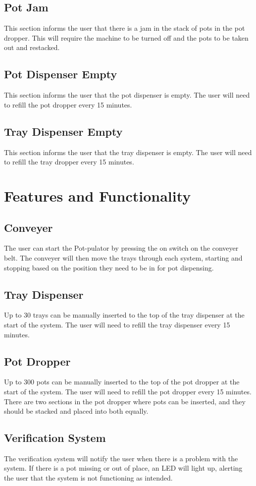 \documentclass{article}
\begin{document}
\subsection{Pot Jam}
This section informs the user that there is a jam in the stack of pots in the pot dropper. This will require the machine to be turned off and the pots to be taken out and restacked. 
\subsection{Pot Dispenser Empty}
This section informs the user that the pot dispenser is empty. The user will need to refill the pot dropper every 15 minutes.
\subsection{Tray Dispenser Empty}
This section informs the user that the tray dispenser is empty. The user will need to refill the tray dropper every 15 minutes.
\section{Features and Functionality}
\subsection{Conveyer}
The user can start the Pot-pulator by pressing the on switch on the conveyer belt. The conveyer will then move the trays through each system, starting and stopping based on the position they need to be in for pot dispensing. 
\subsection{Tray Dispenser}
Up to 30 trays can be manually inserted to the top of the tray dispenser at the start of the system. The user will need to refill the tray dispenser every 15 minutes.
\subsection{Pot Dropper}
Up to 300 pots can be manually inserted to the top of the pot dropper at the start of the system. The user will need to refill the pot dropper every 15 minutes. There are two sections in the pot dropper where pots can be inserted, and they should be stacked and placed into both equally.
\subsection{Verification System}
The verification system will notify the user when there is a problem with the system. If there is a pot missing or out of place, an LED will light up, alerting the user that the system is not functioning as intended. 
\end{document}
